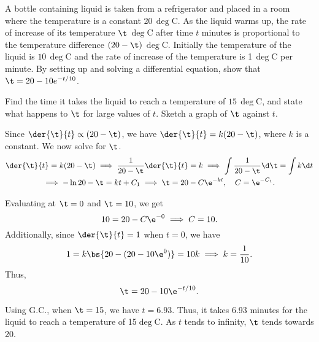 \begin{problem}
    A bottle containing liquid is taken from a refrigerator and placed in a room where the temperature is a constant 20\,$\deg$C. As the liquid warms up, the rate of increase of its temperature $\t$\,$\deg$C after time $t$ minutes is proportional to the temperature difference $(20-\t)$\,$\deg$C. Initially the temperature of the liquid is $10$\,$\deg$C and the rate of increase of the temperature is 1\,$\deg$C per minute. By setting up and solving a differential equation, show that $\t = 20 - 10e^{-t/10}$.

    Find the time it takes the liquid to reach a temperature of $15$\,$\deg$C, and state what happens to $\t$ for large values of $t$. Sketch a graph of $\t$ against $t$.
\end{problem}
\begin{solution}
    Since $\der{\t}{t} \propto (20 - \t)$, we have $\der{\t}{t} = k(20 - \t)$, where $k$ is a constant. We now solve for $\t$.
    \begin{gather*}
        \der{\t}{t} = k(20 - \t) \implies \frac1{20 - \t} \der{\t}{t} = k \implies \int \frac1{20 - \t} \d \t = \int k \d t \\
        \implies - \ln{20 - \t} = kt + C_1 \implies \t = 20 - C\e^{-kt}, \quad C = \e^{-C_1}.
    \end{gather*}

    Evaluating at $\t = 0$ and $\t = 10$, we get \[10 = 20 - C\e^{-0} \implies C = 10.\] Additionally, since $\der{\t}{t} = 1$ when $t = 0$, we have \[1 = k\bs{20 - (20 - 10\e^0)} = 10k \implies k = \frac1{10}.\] Thus, \[\t = 20 - 10\e^{-t/10}.\]

    Using G.C., when $\t = 15$, we have $t = 6.93$. Thus, it takes 6.93 minutes for the liquid to reach a temperature of 15$\deg$C. As $t$ tends to infinity, $\t$ tends towards 20.

    \begin{center}
    \end{center}
\end{solution}

